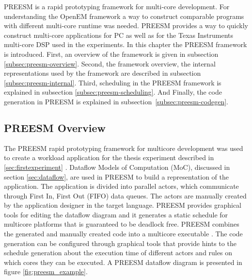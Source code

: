 PREESM is a rapid prototyping framework for multi-core development. For understanding the OpenEM framework a way to construct comparable programs with different multi-core runtime was needed. PREESM provides a way to quickly construct multi-core applications for PC as well as for the Texas Instruments multi-core DSP used in the experiments. In this chapter the PREESM framework is introduced. First, an overview of the framework is given in subsection \ref{subsec:preesm-overview}. Second, the framework overview, the internal representations used by the framework are described in subsection \ref{subsec:preesm-internal}. Third, scheduling in the PREESM framework is explained in subsection \ref{subsec:preesm-scheduling}. And Finally, the code generation in PREESM is explained in subsection~\ref{subsec:preesm-codegen}.

\subsection{PREESM Overview}
\label{sec:preesmover}
The PREESM rapid prototyping framework for multicore development was used to create a workload application for the thesis experiment described in \ref{sec:firstexperiment} . Dataflow Models of Computation (MoC), discussed in section \ref{sec:dataflow}, are used in PREESM to build a representation of the application. The application is divided into parallel actors, which communicate through First In, First Out (FIFO) data queues. The actors are manually created by the application designer in the target language. PREESM provides graphical tools for editing the dataflow diagram and it generates a static schedule for multicore platforms that is guaranteed to be deadlock free. PREESM combines the generated and manually created code into a multicore executable \cite{pelcat2014preesm}. The code generation can be configured through graphical tools that provide hints to the schedule generation about the execution time of different actors and rules on which cores they can be executed. A PREESM dataflow diagram is presented in figure \ref{fig:preesm_example}.


